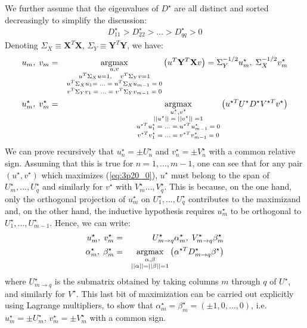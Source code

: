 We further assume that the eigenvalues of $D ^{\star}$ are all distinct and sorted decreasingly to simplify the discussion:
\begin{eqnarray*}
    D ^{\star}_{11} > D  ^{\star}_{22} > \ldots > D ^{\star}_{qq} > 0
\end{eqnarray*}
Denoting
$\Sigma_X \equiv \mathbf{X}^T \mathbf{X}$, $\Sigma_Y \equiv \mathbf{Y}^T \mathbf{Y}$, we have:
\begin{eqnarray}\nonumber
u_m, \;v_m & = & \operatorname*{argmax}_{\substack{u, v \\ u^T \Sigma_X u = 1, \quad v^T \Sigma_Y v = 1 \\ u^T \Sigma_X u_1 =\; \ldots\; = \; u^T \Sigma_X u_{m- 1} \;=\;0 \\ v^T \Sigma_Y v_1\;=\;\ldots\; = \;v^T \Sigma_Y v_{m- 1}\;=\;0}} \left( u^T \mathbf{Y}^T \mathbf{X} v \right) = \Sigma_Y^{-1/2} u_m ^{\star}, \;\Sigma_X^{-1/2} v_m ^{\star} \\
u_m ^{\star}, \; v_m ^{\star} & = & \operatorname*{argmax}_{\substack{u ^{\star}, v ^{\star} \\ || u ^{\star}||\;=\;|| v ^{\star} ||\;= 1 \\ u ^{\star T} u ^{\star}_1\;=\; \ldots\; = \;u ^{\star T} u ^{\star}_{m - 1}\;=\;0 \\ v ^{\star T} v ^{\star}_1\;=\; \ldots\; = \;v ^{\star T} v ^{\star}_{m - 1}\;=\;0}} \left( u ^{\star T} U ^{\star} D ^{\star} V^{\star T} v ^{\star} \right) \label{eq:3p20_0}
\end{eqnarray}
We can prove recursively that $u ^{\star}_n = \pm U ^{\star}_n$ and $v ^{\star}_n = \pm V ^{\star}_n$ with a common relative sign. Assuming that this is true for $n = 1, \ldots, m - 1$, one can see that for any pair $(u ^{\star}, v ^{\star})$ which maximizes (\ref{eq:3p20_0}), $u ^{\star}$ must belong to the span of $U ^{\star}_{m}, \ldots, U ^{\star}_{q}$ and similarly for $v ^{\star}$ with $V ^{\star}_m \ldots, V ^{\star}_q$. This is because, on the one hand, only the orthogonal projection of $u ^{\star}_m$ on $U ^{\star}_1, \ldots, U ^{\star}_q$ contributes to the maximizand and, on the other hand, the inductive hypothesis requires $u ^{\star}_m$ to be orthogonal to $U ^{\star}_1, \ldots, U ^{\star}_{m - 1}$. Hence, we can write:
\begin{eqnarray*}
    u_m ^{\star}, \; v_m ^{\star} & = & U ^{\star}_{m\rightarrow q} \alpha_m ^{\star}, \; V ^{\star}_{m\rightarrow q} \beta_m ^{\star} \\
    \alpha_m ^{\star}, \; \beta_m ^{\star} & = & \operatorname*{argmax}_{\substack{\alpha, \beta \\ ||\alpha|| = ||\beta|| = 1}} \left( \alpha ^{\star T} D ^{\star}_{m\rightarrow q} \beta ^{\star} \right)
\end{eqnarray*}
where $U ^{\star}_{m \rightarrow q}$ is the submatrix obtained by taking columns $m$ through $q$ of $U ^{\star}$, and similarly for $V ^{\star}$. This last bit of maximization can be carried out explicitly using Lagrange multipliers, to show that $\alpha ^{\star}_m = \beta ^{\star}_m = \left( \pm 1, 0, \ldots, 0 \right)$, i.e. $u ^{\star}_m = \pm U ^{\star}_m$, $v ^{\star}_m = \pm V ^{\star}_m$ with a common sign.